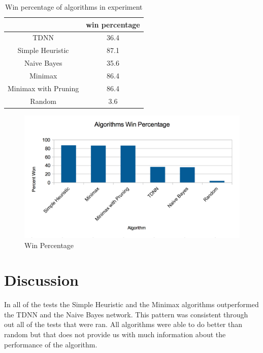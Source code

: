 \documentclass[12pt,letterpaper]{article}
\begin{document}
\begin{table}[h]
\begin{center}
\begin{tabular}{|c||c|}
\hline
& win percentage\\
\hline \hline
TDNN & 36.4\\
\hline 
Simple Heuristic & 87.1\\
\hline 
Naive Bayes & 35.6\\
\hline 
Minimax & 86.4\\
\hline 
Minimax with Pruning & 86.4\\
\hline 
Random & 3.6\\
\hline 
\end{tabular}
\end{center}
\caption{Win percentage of algorithms in experiment}
\label{WinPercentTable}
\end{table}

\begin{figure}[h]
\begin{center}
\includegraphics[width=7in]{winpercent.png}
\end{center}
\caption{Win Percentage}
\label{WinGraph}
\end{figure}

\clearpage

\section{Discussion}
In all of the tests the Simple Heuristic and the Minimax algorithms outperformed the TDNN and the Naive Bayes network. This pattern was consistent through out all of the tests that were ran. All algorithms were able to do better than random but that does not provide us with much information about the performance of the algorithm. 
\end{document}
